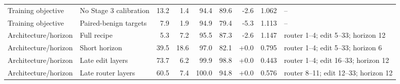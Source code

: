 \begin{table}[H]
{\begin{tabular}{llrrrrrrl}
Training objective & No Stage 3 calibration & 13.2 & 1.4 & 94.4 & 89.6 & -2.6 & 1.062 & -- \\
Training objective & Paired-benign targets & 7.9 & 1.9 & 94.9 & 79.4 & -5.3 & 1.113 & -- \\
\midrule
Architecture/horizon & Full recipe & 5.3 & 7.2 & 95.5 & 87.3 & -2.6 & 1.147 & router 1--4; edit 5--33; horizon 12 \\
Architecture/horizon & Short horizon & 39.5 & 18.6 & 97.0 & 82.1 & +0.0 & 0.795 & router 1--4; edit 5--33; horizon 6 \\
Architecture/horizon & Late edit layers & 73.7 & 6.2 & 99.9 & 98.8 & +0.0 & 0.443 & router 1--4; edit 16--33; horizon 12 \\
Architecture/horizon & Late router layers & 60.5 & 7.4 & 100.0 & 94.8 & +0.0 & 0.576 & router 8--11; edit 12--33; horizon 12 \\
\bottomrule
\end{tabular}}
\end{table}

